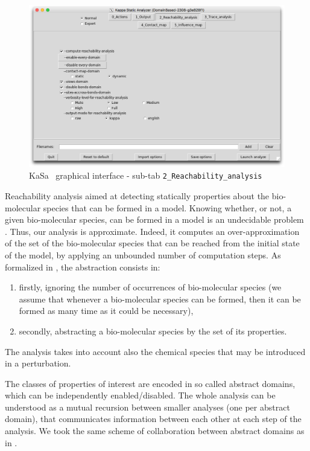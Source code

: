 \documentclass[11pt]{book}
\def\KaSa{\textsf{KaSa}}
\begin{document}
\begin{figure}[htbp]
\centering
\includegraphics[width=12cm,bb=0 0 1904 1208]{img/kasa_2.png}
\caption{\KaSa~ graphical interface - sub-tab \texttt{2\_Reachability\_analysis}}
\label{fig:kasa:2}
\end{figure}

Reachability analysis aimed at detecting statically properties about the bio-molecular species that can be formed in a model.
Knowing whether, or not, a given bio-molecular species, can be formed in a model is an undecidable problem \cite{Kreyssig}. Thus, our analysis is approximate. Indeed, it computes an over-approximation of the set of the bio-molecular species that can be reached from the initial state of the model, by applying an unbounded number of computation steps. As formalized in \cite{DanosEtAl-VMCAI08,Feret:SASB2016}, the abstraction consists in:
\begin{enumerate}
\item firstly, ignoring the number of occurrences of bio-molecular species (we assume that whenever a bio-molecular species can be formed, then it can be formed as many time as it could be necessary),
\item secondly, abstracting a bio-molecular species by the set of its properties.
\end{enumerate}
The analysis takes into account also the chemical species that may be introduced in a perturbation.

The classes of properties of interest are encoded in so called abstract domains, which can be independently enabled/disabled. The whole analysis can be understood as a mutual recursion between smaller analyses (one per abstract domain), that communicates information between each other at each step of the analysis. We took the same scheme of collaboration between abstract domains as in  \cite{CousotEtAl06-ASIAN}.
\end{document}
